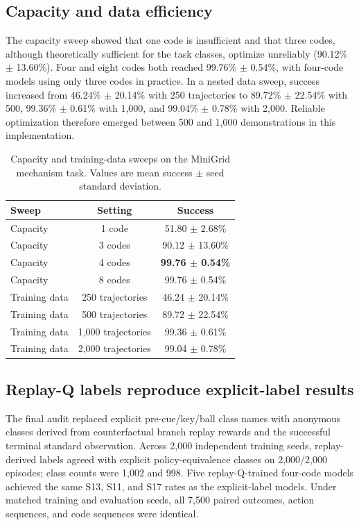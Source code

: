 \documentclass[11pt]{article}
\begin{document}
\subsection{Capacity and data efficiency}
The capacity sweep showed that one code is insufficient and that three codes, although theoretically sufficient for the task classes, optimize unreliably (90.12\% $\pm$ 13.60\%). Four and eight codes both reached 99.76\% $\pm$ 0.54\%, with four-code models using only three codes in practice. In a nested data sweep, success increased from 46.24\% $\pm$ 20.14\% with 250 trajectories to 89.72\% $\pm$ 22.54\% with 500, 99.36\% $\pm$ 0.61\% with 1,000, and 99.04\% $\pm$ 0.78\% with 2,000. Reliable optimization therefore emerged between 500 and 1,000 demonstrations in this implementation.

\begin{table}[t]
\centering
\caption{Capacity and training-data sweeps on the MiniGrid mechanism task. Values are mean success $\pm$ seed standard deviation.}
\label{tab:capacity}
\begin{tabular}{@{}lcc@{}}
\toprule
Sweep & Setting & Success\\
\midrule
Capacity & 1 code & 51.80 $\pm$ 2.68\%\\
Capacity & 3 codes & 90.12 $\pm$ 13.60\%\\
Capacity & 4 codes & \textbf{99.76 $\pm$ 0.54\%}\\
Capacity & 8 codes & 99.76 $\pm$ 0.54\%\\
Training data & 250 trajectories & 46.24 $\pm$ 20.14\%\\
Training data & 500 trajectories & 89.72 $\pm$ 22.54\%\\
Training data & 1,000 trajectories & 99.36 $\pm$ 0.61\%\\
Training data & 2,000 trajectories & 99.04 $\pm$ 0.78\%\\
\bottomrule
\end{tabular}
\end{table}

\subsection{Replay-Q labels reproduce explicit-label results}
The final audit replaced explicit pre-cue/key/ball class names with anonymous classes derived from counterfactual branch replay rewards and the successful terminal standard observation. Across 2,000 independent training seeds, replay-derived labels agreed with explicit policy-equivalence classes on 2,000/2,000 episodes; class counts were 1,002 and 998. Five replay-Q-trained four-code models achieved the same S13, S11, and S17 rates as the explicit-label models. Under matched training and evaluation seeds, all 7,500 paired outcomes, action sequences, and code sequences were identical.
\end{document}
